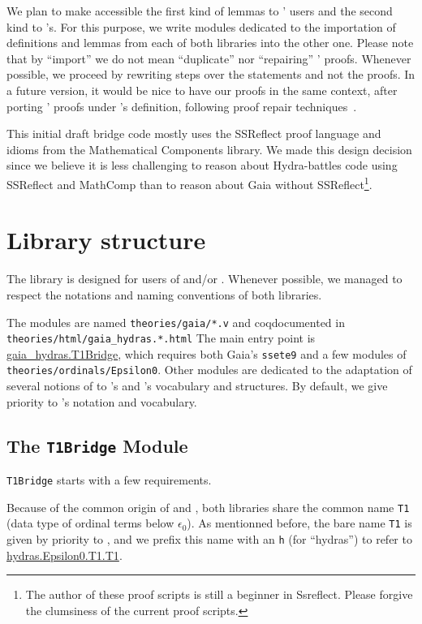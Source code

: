   We plan to make accessible the first kind of lemmas to \HydrasLib' users and the second kind to \gaia's. For this purpose, we write modules dedicated to the importation of definitions and lemmas from each of both libraries into the other one.
  Please note that by ``import'' we do not mean ``duplicate''
  nor ``repairing'' \HydrasLib' proofs.  Whenever possible, we proceed by rewriting steps over the statements and not the proofs. In a future version, it would be nice to have our proofs in the same context, after porting \HydrasLib' proofs under \gaia's
  definition, following  proof repair  techniques~\cite{ringer2021}.



This initial draft bridge code mostly uses the SSReflect proof language
and idioms from the Mathematical Components library. We made this design
decision since we believe it is less challenging to reason about
Hydra-battles code using SSReflect and MathComp than to reason about
Gaia without SSReflect\footnote{The author of these proof scripts is still a beginner in Ssreflect. Please forgive the clumsiness of the current proof scripts.}.

\section{Library structure}
The \gaiaHydras library is designed for users of
\gaia and/or  \HydrasLib. Whenever possible, we managed to respect the notations and naming conventions of both libraries.

The modules are named {\texttt{theories/gaia/*.v}} and coqdocumented in {\texttt{theories/html/gaia\_hydras.*.html}}
The main entry point is
\href{../theories/html/gaia_hydras.T1Bridge.html}{gaia\_hydras.T1Bridge}, which requires both Gaia's \texttt{ssete9} and a few modules of \texttt{theories/ordinals/Epsilon0}.
Other modules are dedicated to the adaptation of several notions of \HydrasLib to \mathcomp's and \gaia's vocabulary and structures.
By default, we give priority to \gaia's notation and vocabulary.


\subsection{The \texttt{T1Bridge} Module}

\texttt{T1Bridge} starts with a few requirements.

Because of the common origin of \HydrasLib and \gaia, both libraries share the common name \texttt{T1} (data type of ordinal terms below $\epsilon_0$). As mentionned before, the bare name \texttt{T1} is given by priority to \gaia, and we prefix this name with an \texttt{h} (for ``hydras'') to refer to
\href{../theories/html/Epsilon0.T1.html}{hydras.Epsilon0.T1.T1}.

